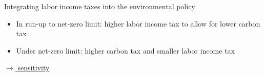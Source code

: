 \documentclass[11pt,aspectratio=169]{beamer}
\begin{document}
\begin{frame}{Integrating labor income taxes into the environmental policy}
\begin{figure}[h!!]
\begin{subfigure}{0.45\textwidth}
		\end{subfigure}
	\end{figure}
	\vspace{3mm}
	
	\begin{block}{}
		\begin{itemize}
			\item In run-up to net-zero limit: higher labor income tax to allow for lower carbon tax
			\item Under net-zero limit: higher carbon tax and smaller labor income tax
		\end{itemize}
	\end{block}	
	\vspace{-4.5mm}
	\hypertarget{backmec}{}
	\hfill
	\hyperlink{sensphi}{\tiny{$\rightarrow$ sensitivity}}
\end{frame}
\end{document}
